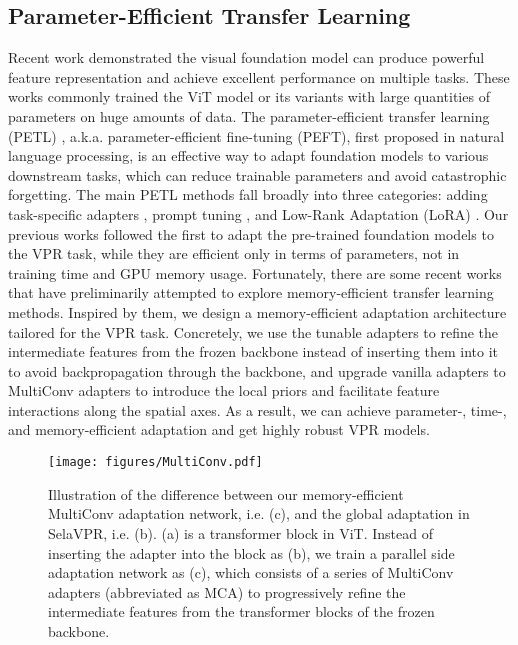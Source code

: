 \subsection{Parameter-Efficient Transfer Learning}
Recent work \cite{clip,dino,wang2023image,dinov2} demonstrated the visual foundation model can produce powerful feature representation and achieve excellent performance on multiple tasks. These works commonly trained the ViT \cite{vit} model or its variants with large quantities of parameters on huge amounts of data. The parameter-efficient transfer learning (PETL) \cite{adapter}, a.k.a. parameter-efficient fine-tuning (PEFT), first proposed in natural language processing, is an effective way to adapt foundation models to various downstream tasks, which can reduce trainable parameters and avoid catastrophic forgetting. The main PETL methods fall broadly into three categories: adding task-specific adapters \cite{adapter}, prompt tuning \cite{prompttuning}, and Low-Rank Adaptation (LoRA) \cite{lora}. Our previous works \cite{selavpr,cricavpr} followed the first to adapt the pre-trained foundation models to the VPR task, while they are efficient only in terms of parameters, not in training time and GPU memory usage. Fortunately, there are some recent works \cite{lst,metl} that have preliminarily attempted to explore memory-efficient transfer learning methods. Inspired by them, we design a memory-efficient adaptation architecture tailored for the VPR task. Concretely, we use the tunable adapters to refine the intermediate features from the frozen backbone instead of inserting them into it to avoid backpropagation through the backbone, and upgrade vanilla adapters to MultiConv adapters to introduce the local priors and facilitate feature interactions along the spatial axes. As a result, we can achieve parameter-, time-, and memory-efficient adaptation and get highly robust VPR models.
\begin{figure*}[!t]
    \centering
    \texttt{[image: figures/MultiConv.pdf]}
    \vspace{-0.2cm}
    \caption{
        Illustration of the difference between our memory-efficient MultiConv adaptation network, i.e. (c), and the global adaptation in SelaVPR, i.e. (b). (a) is a transformer block in ViT. Instead of inserting the adapter into the block as (b), we train a parallel side adaptation network as (c), which consists of a series of MultiConv adapters (abbreviated as MCA) to progressively refine the intermediate features from the transformer blocks of the frozen backbone.
		}
    \vspace{-0.3cm}
    \label{MultiConv}
\end{figure*}